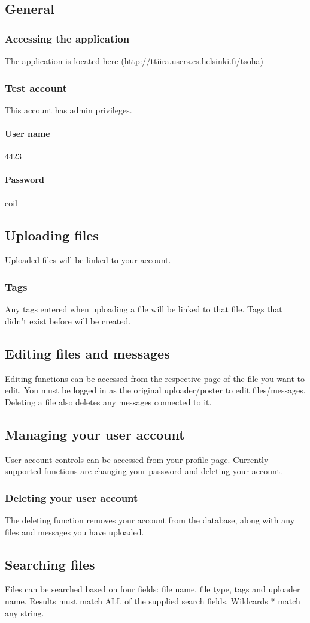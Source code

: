 \documentclass[10pt,a4paper]{article}
\begin{document}
\subsection{General}
\subsubsection{Accessing the application}
The application is located \href{http://ttiira.users.cs.helsinki.fi/tsoha}{here} (http://ttiira.users.cs.helsinki.fi/tsoha)
\subsubsection{Test account}
This account has admin privileges.
\paragraph{User name} 4423
\paragraph{Password} coil

\subsection{Uploading files}
Uploaded files will be linked to your account. 
\subsubsection{Tags}
Any tags entered when uploading a file will be linked to that file. Tags that didn't exist before will be created.

\subsection{Editing files and messages}
Editing functions can be accessed from the respective page of the file you want to edit. You must be logged in as the original uploader/poster to edit files/messages. Deleting a file also deletes any messages connected to it.

\subsection{Managing your user account}
User account controls can be accessed from your profile page. Currently supported functions are changing your password and deleting your account.
\subsubsection{Deleting your user account}
The deleting function removes your account from the database, along with any files and messages you have uploaded.

\subsection{Searching files}
Files can be searched based on four fields: file name, file type, tags and uploader name. Results must match ALL of the supplied search fields. Wildcards * match any string.
\end{document}
